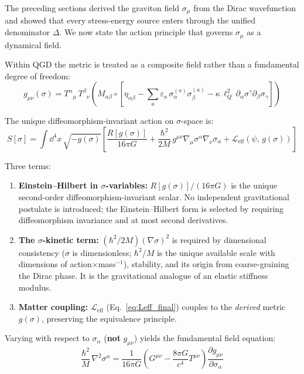 \documentclass[11pt,a4paper]{article}
\theoremstyle{definition}
\theoremstyle{remark}
\begin{document}
	The preceding sections derived the graviton field $\sigma_\mu$ from the Dirac wavefunction and showed that every stress-energy source enters through the unified denominator $\Delta$.  We now state the action principle that governs $\sigma_\mu$ as a dynamical field.
	
	Within QGD the metric is treated as a composite field rather than a fundamental degree of freedom:
	\begin{equation}
		g_{\mu\nu}(\sigma) = T^\alpha{}_\mu\,T^\beta{}_\nu\!\left(M_{\alpha\beta}\circ\left[\eta_{\alpha\beta} - \sum_a\varepsilon_a\,\sigma_\alpha^{(a)}\sigma_\beta^{(a)} - \kappa\,\ell_Q^2\,\partial_\alpha\sigma^\gamma\partial_\beta\sigma_\gamma\right]\right)
		\label{eq:master_metric_preview}
	\end{equation}
	
	The unique diffeomorphism-invariant action on $\sigma$-space is:
	\begin{equation}
		\boxed{S[\sigma] = \int\!\dd^4x\,\sqrt{-g(\sigma)}\left[\frac{R[g(\sigma)]}{16\pi G} + \frac{\hbar^2}{2M}\,g^{\mu\nu}\nabla_\mu\sigma^\alpha\nabla_\nu\sigma_\alpha + \mathcal{L}_{\mathrm{eff}}(\psi,\,g(\sigma))\right]}
		\label{eq:qgd_action}
	\end{equation}
	
	Three terms:
	\begin{enumerate}
		\item \textbf{Einstein--Hilbert in $\sigma$-variables:} $R[g(\sigma)]/(16\pi G)$ is the unique second-order diffeomorphism-invariant scalar.  No independent gravitational postulate is introduced; the Einstein--Hilbert form is selected by requiring diffeomorphism invariance and at most second derivatives.
		\item \textbf{The $\sigma$-kinetic term:} $(\hbar^2/2M)(\nabla\sigma)^2$ is required by dimensional consistency ($\sigma$ is dimensionless; $\hbar^2/M$ is the unique available scale with dimensions of action$\times$mass$^{-1}$), stability, and its origin from coarse-graining the Dirac phase.  It is the gravitational analogue of an elastic stiffness modulus.
		\item \textbf{Matter coupling:} $\mathcal{L}_{\mathrm{eff}}$ (Eq.~\eqref{eq:Leff_final}) couples to the \emph{derived} metric $g(\sigma)$, preserving the equivalence principle.
	\end{enumerate}
	
	Varying with respect to $\sigma_\alpha$ (\textbf{not} $g_{\mu\nu}$) yields the fundamental field equation:
	\begin{equation}
		\boxed{\frac{\hbar^2}{M}\,\nabla^2\sigma^\alpha = \frac{1}{16\pi G}\!\left(G^{\mu\nu} - \frac{8\pi G}{c^4}T^{\mu\nu}\right)\frac{\partial g_{\mu\nu}}{\partial\sigma_\alpha}}
		\label{eq:sigma_field_eq}
	\end{equation}
	
\end{document}
